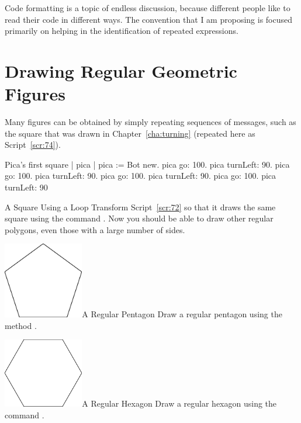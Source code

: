 \documentclass[a4paper,10pt,twoside]{book}
\begin{document}
Code formatting is a topic of endless discussion, because different people like to read their 
code in different ways. The convention that I am proposing is focused primarily on helping in 
the identification of repeated expressions.
 
\section{Drawing Regular Geometric Figures} 

Many figures can be obtained by simply repeating sequences of messages, such as the square 
that was drawn in Chapter~\ref{cha:turning} (repeated here as Script~\ref{scr:74}). 

\begin{script}[74]{Pica’s first square}
| pica | 
pica := Bot new. 
pica go: 100. 
pica turnLeft: 90. 
pica go: 100. 
pica turnLeft: 90. 
pica go: 100. 
pica turnLeft: 90. 
pica go: 100. 
pica turnLeft: 90
\end{script}


\begin{exonofigtitle}{A Square Using a Loop}
Transform Script~\ref{scr:72} so that it draws the same square using the command . Now you should be able to draw other regular polygons, even those with a large number of sides.
\end{exonofigtitle}


\begin{exofigwithsizeandtitle}[0.65]{\includegraphics[width=3.5cm]{loopPentagon}}{A Regular Pentagon}\label{xp:73}
Draw a regular pentagon using the method . 
\end{exofigwithsizeandtitle}


\begin{exofigwithsizeandtitle}[0.65]{\includegraphics[width=3.5cm]{loopHexagon}}{A Regular Hexagon}\label{xp:74}
Draw a regular hexagon using the command .
\end{exofigwithsizeandtitle}
\end{document}
